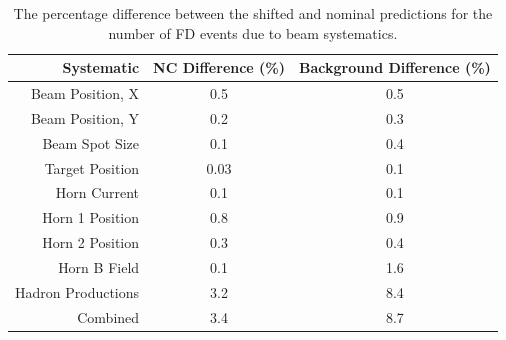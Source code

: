\begin{table}[h]
  \begin{center}
    \caption[Beam Systematic Errors]{The percentage difference between the shifted and nominal predictions for the number of FD events due to beam systematics.}
    \label{tab:SystBeam}
    \begin{tabular}{r c c}
      \hline\hline
      Systematic & NC Difference (\%) & Background Difference (\%) \\
      \hline
      Beam Position, X & 0.5 & 0.5 \\
      Beam Position, Y & 0.2 & 0.3 \\
      Beam Spot Size & 0.1 & 0.4 \\
      Target Position & 0.03 & 0.1 \\
      Horn Current & 0.1 & 0.1 \\
      Horn 1 Position & 0.8 & 0.9 \\
      Horn 2 Position & 0.3 & 0.4 \\
      Horn B Field & 0.1 & 1.6 \\
      Hadron Productions & 3.2 & 8.4 \\
      \hline
      Combined & 3.4 & 8.7 \\
      \hline
    \end{tabular}
  \end{center}
\end{table}

